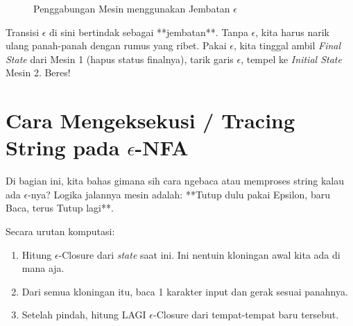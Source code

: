 \documentclass[12pt,a4paper]{article}
\begin{document}
\begin{figure}[h]
    \centering
    \caption{Penggabungan Mesin menggunakan Jembatan $\epsilon$}
\end{figure}

Transisi $\epsilon$ di sini bertindak sebagai **jembatan**. Tanpa $\epsilon$, kita harus narik ulang panah-panah dengan rumus yang ribet. Pakai $\epsilon$, kita tinggal ambil \textit{Final State} dari Mesin 1 (hapus status finalnya), tarik garis $\epsilon$, tempel ke \textit{Initial State} Mesin 2. Beres!

\newpage
\section{Cara Mengeksekusi / Tracing String pada $\epsilon$-NFA}

Di bagian ini, kita bahas gimana sih cara ngebaca atau memproses string kalau ada $\epsilon$-nya? Logika jalannya mesin adalah: **Tutup dulu pakai Epsilon, baru Baca, terus Tutup lagi**.

Secara urutan komputasi:
\begin{enumerate}
    \item Hitung $\epsilon$-Closure dari \textit{state} saat ini. Ini nentuin kloningan awal kita ada di mana aja.
    \item Dari semua kloningan itu, baca 1 karakter input dan gerak sesuai panahnya.
    \item Setelah pindah, hitung LAGI $\epsilon$-Closure dari tempat-tempat baru tersebut.
\end{enumerate}
\end{document}

